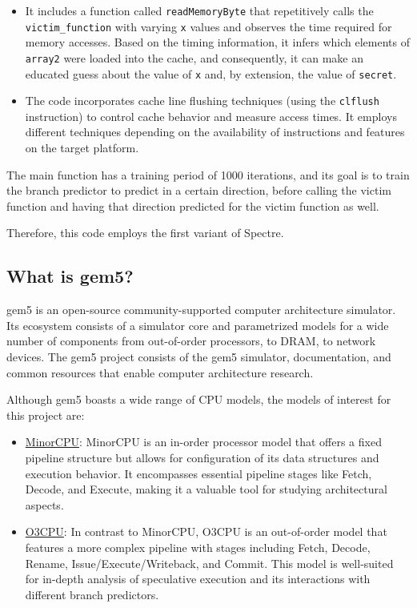 \documentclass[twocolumn,showpacs,%
  nofootinbib,aps,superscriptaddress,%
  eqsecnum,prd,notitlepage,showkeys,10pt]{revtex4-1}
\begin{document}
\begin{itemize}
  \item It includes a function called \texttt{readMemoryByte} that repetitively calls the \texttt{victim\_function} with varying \texttt{x} values and observes the time required for memory accesses. Based on the timing information, it infers which elements of \texttt{array2} were loaded into the cache, and consequently, it can make an educated guess about the value of \texttt{x} and, by extension, the value of \texttt{secret}.
  
  \item The code incorporates cache line flushing techniques (using the \texttt{clflush} instruction) to control cache behavior and measure access times. It employs different techniques depending on the availability of instructions and features on the target platform.
\end{itemize}

The main function has a training period of 1000 iterations, and its goal is to train the branch predictor to predict in a certain direction, before calling the victim function and having that direction predicted for the victim function as well.

Therefore, this code employs the first variant of Spectre.

\subsection{What is gem5?}

gem5 is an open-source community-supported computer architecture simulator. Its ecosystem consists of a simulator core and parametrized models for a wide number of components from out-of-order processors, to DRAM, to network devices. The gem5 project consists of the gem5 simulator, documentation, and common resources that enable computer architecture research. \cite{lowepower2020gem5}


Although gem5 boasts a wide range of CPU models, the models of interest for this project are:

\begin{itemize}
    \item \underline{MinorCPU}: MinorCPU is an in-order processor model that offers a fixed pipeline structure but allows for configuration of its data structures and execution behavior. It encompasses essential pipeline stages like Fetch, Decode, and Execute, making it a valuable tool for studying architectural aspects.\cite{butko2015design}
    \item \underline{O3CPU}: In contrast to MinorCPU, O3CPU is an out-of-order model that features a more complex pipeline with stages including Fetch, Decode, Rename, Issue/Execute/Writeback, and Commit. This model is well-suited for in-depth analysis of speculative execution and its interactions with different branch predictors.\cite{butko2015design}
\end{itemize}
\end{document}
